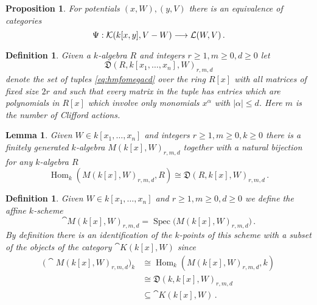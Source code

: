 \documentclass[english,letter paper,12pt,leqno]{article}
\newtheorem{proposition}[theorem]{Proposition}
\newtheorem{lemma}[theorem]{Lemma}
\theoremstyle{example}
\newtheorem{definition}[theorem]{Definition}
\numberwithin{equation}{section}
\def\Hom{\operatorname{Hom}}
\def\be{\begin{equation}}
\def\ee{\end{equation}}
\DeclareMathOperator{\Spec}{Spec}
\begin{document}
\begin{proposition} For potentials $(x,W),(y,V)$ there is an equivalence of categories
\be\label{eq:equivalence_psi_final}
\Psi: \cat{K}( k[x,y], V - W ) \lto \cat{L}( W, V )\,.
\ee
\end{proposition}

\begin{definition} Given a $k$-algebra $R$ and integers $r \ge 1,m \ge 0, d \ge 0$ let
\[
\mathfrak{D}(R, k[x_1,\ldots,x_n],W)_{r,m,d}
\]
denote the set of tuples \eqref{eq:hmfomegacd} over the ring $R[x]$ with all matrices of fixed size $2r$ and such that every matrix in the tuple has entries which are polynomials in $R[x]$ which involve only monomials $x^\alpha$ with $|\alpha| \le d$. Here $m$ is the number of Clifford actions.
\end{definition}

\begin{lemma} Given $W \in k[x_1,\ldots,x_n]$ and integers $r \ge 1, m \ge 0, k \ge 0$ there is a finitely generated $k$-algebra $M(k[x],W)_{r,m,d}$ together with a natural bijection for any $k$-algebra $R$
\[
\Hom_{k}( M(k[x],W)_{r,m,d}, R ) \cong \mathfrak{D}( R, k[x], W )_{r,m,d}\,.
\]
\end{lemma}

\begin{definition} Given $W \in k[x_1,\ldots,x_n]$ and $r \ge 1,m \ge 0, d \ge 0$ we define the affine $k$-scheme
\[
\cat{M}( k[x], W )_{r,m,d} = \Spec\big( M(k[x],W)_{r,m, d} \big)\,.
\]
By definition there is an identification of the $k$-points of this scheme with a subset of the objects of the category $\cat{K}( k[x], W )$ since
\begin{align*}
\Big( \cat{M}( k[x], W )_{r,m,d} \Big)_k &\cong \Hom_k( M(k[x],W)_{r,m,d}, k )\\
&\cong \mathfrak{D}( k, k[x], W )_{r,m,d}\\
&\subseteq \cat{K}( k[x], W )\,.
\end{align*}
\end{definition}
\end{document}
